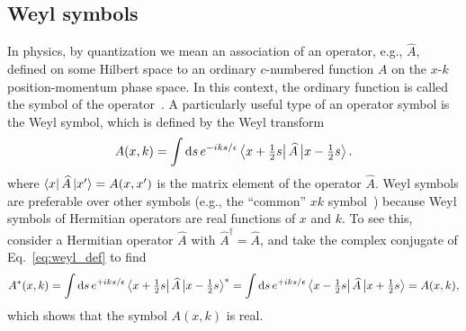 \begin{subappendices}

\section{Weyl symbols}
\label{sec:weyl}

In physics, by quantization we mean an association of an operator, e.g., $\widehat{A}$, defined on some Hilbert space to an ordinary $c$-numbered function $A$ on the $x$-$k$ position-momentum phase space.
In this context, the ordinary function is called the symbol of the operator~\cite[\S 2.3.1]{chaichian2001}.
A particularly useful type of an operator symbol is the Weyl symbol, which is defined by the Weyl transform
%
\begin{equation}
  A(x, k) = \int \mathrm{d}{s}\, e^{-iks/\epsilon} \left\langle x + \tfrac{1}{2}s\right|\widehat{A}\left|x - \tfrac{1}{2}s\right\rangle.
  \label{eq:weyl_def}
\end{equation}
%
where $\mathinner{\langle{x}\rvert}\widehat{A}\mathinner{\lvert{x'}\rangle} = A(x, x')$ is the matrix element of the operator $\widehat{A}$.
Weyl symbols are preferable over other symbols (e.g., the ``common'' $xk$ symbol~\cite{mcdonald1988}) because Weyl symbols of Hermitian operators are real functions of $x$ and $k$.
To see this, consider a Hermitian operator $\widehat{A}$ with $\widehat{A}^{\dagger} = \widehat{A}$, and take the complex conjugate of Eq.~\eqref{eq:weyl_def} to find
%
\begin{equation}
  A^{*}(x, k) = \int \mathrm{d}{s}\, e^{+iks/\epsilon} \left\langle x + \tfrac{1}{2}s\right|\widehat{A}\left|x - \tfrac{1}{2}s\right\rangle^{*}
  = \int \mathrm{d}{s}\, e^{+iks/\epsilon} \left\langle x - \tfrac{1}{2}s\right|\widehat{A}\left|x + \tfrac{1}{2}s\right\rangle = A(x, k),
  \label{eq:weylsym}
\end{equation}
%
which shows that the symbol $A(x, k)$ is real.


\end{subappendices}
